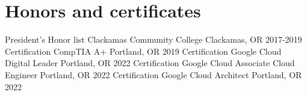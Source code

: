 \section{Honors and certificates}
\begin{cvhonors}

\cvhonor
{President's Honor list} %
{Clackamas Community College} %
{Clackamas, OR} %
{2017-2019} %
\cvhonor
{Certification} %
{CompTIA A+} %
{Portland, OR} %
{2019} %
\cvhonor
{Certification} %
{Google Cloud Digital Leader} %
{Portland, OR} %
{2022} %
\cvhonor
{Certification} %
{Google Cloud Associate Cloud Engineer} %
{Portland, OR} %
{2022} %
\cvhonor
{Certification} %
{Google Cloud Architect} %
{Portland, OR} %
{2022} %
\end{cvhonors}
